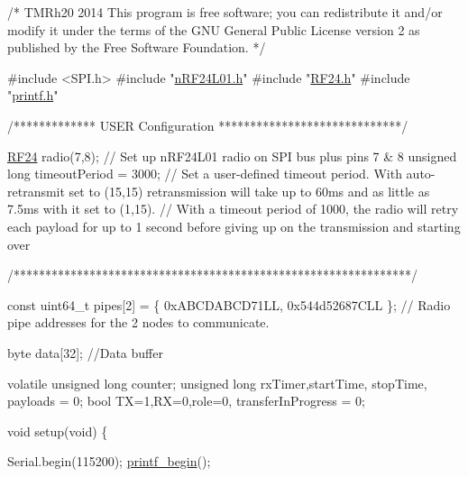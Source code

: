 \begin{DoxyCodeInclude}
\textcolor{comment}{/*}
\textcolor{comment}{TMRh20 2014}
\textcolor{comment}{}
\textcolor{comment}{ This program is free software; you can redistribute it and/or}
\textcolor{comment}{ modify it under the terms of the GNU General Public License}
\textcolor{comment}{ version 2 as published by the Free Software Foundation.}
\textcolor{comment}{ */}

\textcolor{preprocessor}{#include <SPI.h>}
\textcolor{preprocessor}{#include "\hyperlink{nRF24L01_8h}{nRF24L01.h}"}
\textcolor{preprocessor}{#include "\hyperlink{RF24_8h}{RF24.h}"}
\textcolor{preprocessor}{#include "\hyperlink{printf_8h}{printf.h}"}

\textcolor{comment}{/*************  USER Configuration *****************************/}

\hyperlink{classRF24}{RF24} radio(7,8);                        \textcolor{comment}{// Set up nRF24L01 radio on SPI bus plus pins 7 & 8}
\textcolor{keywordtype}{unsigned} \textcolor{keywordtype}{long} timeoutPeriod = 3000;     \textcolor{comment}{// Set a user-defined timeout period. With auto-retransmit set to
       (15,15) retransmission will take up to 60ms and as little as 7.5ms with it set to (1,15).}
                                        \textcolor{comment}{// With a timeout period of 1000, the radio will retry each payload
       for up to 1 second before giving up on the transmission and starting over}

\textcolor{comment}{/***************************************************************/}

\textcolor{keyword}{const} uint64\_t pipes[2] = \{ 0xABCDABCD71LL, 0x544d52687CLL \};   \textcolor{comment}{// Radio pipe addresses for the 2 nodes to
       communicate.}

byte data[32];                           \textcolor{comment}{//Data buffer}

\textcolor{keyword}{volatile} \textcolor{keywordtype}{unsigned} \textcolor{keywordtype}{long} counter;
\textcolor{keywordtype}{unsigned} \textcolor{keywordtype}{long} rxTimer,startTime, stopTime, payloads = 0;  
\textcolor{keywordtype}{bool} TX=1,RX=0,role=0, transferInProgress = 0;


\textcolor{keywordtype}{void} setup(\textcolor{keywordtype}{void}) \{

  Serial.begin(115200);
  \hyperlink{printf_8h_afc0d9ca32710dff550ebe56ab6b39d23}{printf\_begin}();


\end{DoxyCodeInclude}
